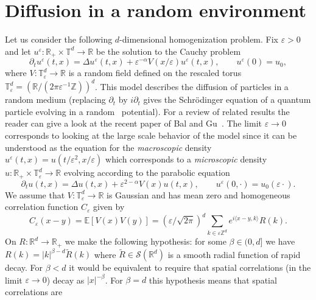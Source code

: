 \documentclass[a4paper,11pt]{article}
\newcommand{\cdummy}{\cdot}
\newcommand{\tmem}[1]{{\em #1\/}}
\newcommand{\CS}{\mathscr{S}}
\begin{document}
\section{Diffusion in a random environment}

Let us consider the following $d$-dimensional homogenization problem. Fix
$\varepsilon > 0$ and let $u^{\varepsilon} : \mathbb{R}_+ \times
\mathbb{T}^d \rightarrow \mathbb{R}$ be the solution to the Cauchy problem
\[ \partial_t u^{\varepsilon} (t, x) = \Delta u^{\varepsilon} (t, x) +
   \varepsilon^{- \alpha} V (x / \varepsilon) u^{\varepsilon} (t, x),
   \hspace{2em} u^{\varepsilon} (0) = u_0, \]
where $V : \mathbb{T}^d_{\varepsilon} \rightarrow \mathbb{R}$ is a random
field defined on the rescaled torus $\mathbb{T}^d_{\varepsilon} =
(\mathbb{R}/ (2 \pi \varepsilon^{- 1} \mathbb{Z}))^d$. This model describes
the diffusion of particles in a random medium (replacing $\partial_t$ by $i
\partial_t$ gives the Schr{\"o}dinger equation of a quantum particle evolving
in a random \ potential). For a review of related results the reader can give
a look at the recent paper of Bal and Gu~{\cite{bal_limiting_2013}}. The limit
$\varepsilon \rightarrow 0$ corresponds to looking at the large scale behavior
of the model since it can be understood as the equation for the
{\tmem{macroscopic}} density $u^{\varepsilon} (t, x) = u (t / \varepsilon^2, x
/ \varepsilon)$ which corresponds to a {\tmem{microscopic}} density $u :
\mathbb{R}_+ \times \mathbb{T}_{\varepsilon}^d \rightarrow \mathbb{R}$
evolving according to the parabolic equation
\[ \partial_t u (t, x) = \Delta u (t, x) + \varepsilon^{2 - \alpha} V (x) u
   (t, x), \hspace{2em} u^{\varepsilon} (0, \cdummy) = u_0 (\varepsilon
   \cdummy) . \]
We assume that $V : \mathbb{T}^d_{\varepsilon} \rightarrow \mathbb{R}$ is
Gaussian and has mean zero and homogeneous correlation function
$C_{\varepsilon}$ given by
\[ C_{\varepsilon} (x - y) =\mathbb{E} [V (x) V (y)] = ( \varepsilon /
   \sqrt{2 \pi} )^d \sum_{k \in \varepsilon \mathbb{Z}^d} e^{i
   \langle x - y, k \rangle} R (k). \]
On $R :
\mathbb{R}^d \rightarrow \mathbb{R}_+$ we make the following hypothesis: for
some $\beta \in (0, d]$ we have $R (k) = | k |^{\beta - d} \tilde{R} (k)$
where $\tilde{R} \in \CS (\mathbb{R}^d)$ is a smooth radial function of rapid
decay. For $\beta < d$ it would be equivalent to require that spatial
correlations (in the limit $\varepsilon \rightarrow 0$) decay as $| x |^{-
\beta}$. For $\beta = d$ this hypothesis means that spatial correlations are
\end{document}
